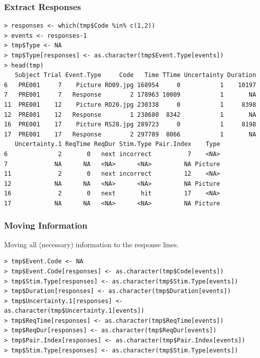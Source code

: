 \documentclass[xcolor={table},c]{beamer}
\begin{document}
\begin{frame}[fragile]\frametitle{Extract Responses}\scriptsize
\begin{verbatim}
> responses <- which(tmp$Code %in% c(1,2))
> events <- responses-1
> tmp$Type <- NA
> tmp$Type[responses] <- as.character(tmp$Event.Type[events])
> head(tmp)
   Subject Trial Event.Type     Code   Time TTime Uncertainty Duration
6   PRE001     7    Picture RO09.jpg 168954     0           1    10197
7   PRE001     7   Response        2 178963 10009           1       NA
11  PRE001    12    Picture RO20.jpg 230338     0           1     8398
12  PRE001    12   Response        1 238680  8342           1       NA
16  PRE001    17    Picture RS28.jpg 289723     0           1     8198
17  PRE001    17   Response        2 297789  8066           1       NA
   Uncertainty.1 ReqTime ReqDur Stim.Type Pair.Index    Type
6              2       0   next incorrect          7    <NA>
7             NA      NA   <NA>      <NA>         NA Picture
11             2       0   next incorrect         12    <NA>
12            NA      NA   <NA>      <NA>         NA Picture
16             2       0   next       hit         17    <NA>
17            NA      NA   <NA>      <NA>         NA Picture
\end{verbatim}
\end{frame}

\begin{frame}[fragile]\frametitle{Moving Information}\scriptsize
Moving all (necessary) information to the response lines.
\begin{verbatim}
> tmp$Event.Code <- NA
> tmp$Event.Code[responses] <- as.character(tmp$Code[events])
> tmp$Stim.Type[responses] <- as.character(tmp$Stim.Type[events])
> tmp$Duration[responses] <- as.character(tmp$Duration[events])
> tmp$Uncertainty.1[responses] <- as.character(tmp$Uncertainty.1[events])
> tmp$ReqTime[responses] <- as.character(tmp$ReqTime[events])
> tmp$ReqDur[responses] <- as.character(tmp$ReqDur[events])
> tmp$Pair.Index[responses] <- as.character(tmp$Pair.Index[events])
> tmp$Stim.Type[responses] <- as.character(tmp$Stim.Type[events])
\end{verbatim}
\end{frame}
\end{document}
